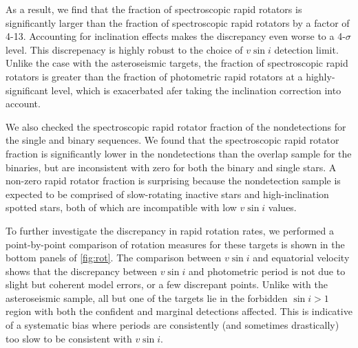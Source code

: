 \documentclass[manuscript]{aastex6}
\newcommand{\vsini}{\ensuremath{v \sin i}}
\begin{document}
As a result, we find that the fraction of
spectroscopic rapid rotators is significantly larger than the fraction
of spectroscopic rapid rotators by a factor of 4-13. 
Accounting for
inclination effects makes the discrepancy even worse to a 4-\(\sigma\)
level. This discrepenacy is highly robust to the choice of
\vsini{} detection limit. Unlike  
the case with the asteroseismic targets, the fraction of spectroscopic rapid
rotators is greater than the fraction of photometric rapid
rotators at a highly-significant level, which is exacerbated afer taking the
inclination correction into account.

We also checked the spectroscopic rapid rotator fraction of the 
\citet{McQuillan14} nondetections for the single and binary sequences. We 
found that the spectroscopic rapid rotator fraction is significantly
lower in the nondetections than the overlap sample for the binaries, but are 
inconsistent with zero for both the binary and single stars. 
A non-zero rapid rotator fraction is surprising because the nondetection
sample is expected to be comprised of slow-rotating inactive stars and 
high-inclination spotted stars, both of which are incompatible with low 
\vsini{} values. 

\begin{figure*}
  \caption{\emph{Left:} APOGEE \vsini{} plotted against equatorial
  velocity computed from the rotation period and radius for targets with
  detected rapid rotation. Targets which are photometric binaries are plotted
  as large circles while targets which are on the single photometric sequence
  are plotted as small stars. The confirmed \vsini{} detections are shown
  in dark blue while the marginal \vsini{} detections are shown in light
  blue. The solid and dashed lines correspond to values where \(\sin i =
  1, 0.5\), respectively. The hatched area represents the forbidden
  region where \(\sin i > 1\). \emph{Middle:} Symbols are similar to left
  side, except points are projected such that the DSEP-derived radius is
  plotted against the radius inferred from \vsini{} and rotation
  period. \emph{Right:} Symbols are similar to left side, except points are
  projected such that the \citet{McQuillan14} period is plotted against the
  period inferred from the \vsini{} and radius.\label{fig:rot}}
\end{figure*}

To further investigate the discrepancy in rapid rotation rates, we
performed a point-by-point comparison of rotation measures for these 
targets is shown in the bottom panels of
\cref{fig:rot}. The comparison between \vsini{} and equatorial velocity shows
that the discrepancy between \vsini{} and photometric period is not due to slight
but coherent model errors, or a few discrepant points. Unlike with the
asteroseismic sample, all but one of the targets
lie in the forbidden \(\sin i > 1\) region with both the confident and
marginal detections affected. This is indicative of a systematic
bias where periods are consistently (and sometimes drastically) too slow to be
consistent with \vsini{}.
\end{document}
